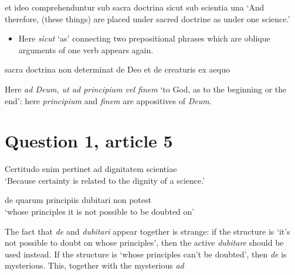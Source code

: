 \documentclass[a4paper, 12pt]{article}
\newcommand{\form}[1]{\emph{#1}}
\newcommand{\translate}[1]{`#1'}
\begin{document}
\begin{exe}
    \ex et ideo comprehenduntur sub sacra doctrina sicut sub scientia una
    \translate{And therefore, (these things) are placed under sacred doctrine as under one science.}
\end{exe}

\begin{itemize}
    \item Here \form{sicut} \translate{as} connecting two prepositional phrases 
    which are oblique arguments of one verb appears again.
\end{itemize}

\begin{exe}
    \ex sacra doctrina non determinat de Deo et de creaturis ex aequo
\end{exe}

\begin{exe}
    \ex Here \form{ad Deum, ut ad principium vel finem} 
    \translate{to God, as to the beginning or the end}: 
    here \form{principium} and \form{finem} are appositives of \form{Deum}.
\end{exe}

\section{Question 1, article 5}

\begin{exe}
    \ex Certitudo enim pertinet ad dignitatem scientiae \\
    \translate{Because certainty is related to the dignity of a science.}
\end{exe}

\begin{exe}
    \ex de quarum principiis dubitari non potest \\ 
    \translate{whose principles it is not possible to be doubted on}
\end{exe}

The fact that \form{de} and \form{dubitari} appear together is strange:
if the structure is \translate{it's not possible to doubt on whose principles}, 
then the active \form{dubitare} should be used instead.
If the structure is \translate{whose principles can't be doubted}, 
then \form{de} is mysterious.
This, together with the mysterious \form{ad }
\end{document}
